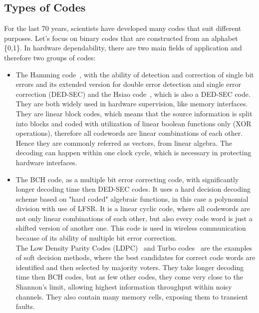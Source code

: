 \subsection{Types of Codes}
For the last 70 years, scientists have developed many codes that suit different purposes. Let's focus on binary codes that are constructed from an alphabet \{0,1\}. In hardware dependability, there are two main fields of application and therefore two groups of codes:
\begin{itemize}
\item The Hamming code~\cite{art:Hamming}, with the ability of detection and correction of single bit errors and its extended version for double error detection and single error correction (DED-SEC) and the Hsiao code~\cite{art:Hsiao}, which is also a DED-SEC code. They are both widely used in hardware supervision, like memory interfaces. They are linear block codes, which means that the source information is split into blocks and coded with utilization of linear boolean functions only (XOR operations), therefore all codewords are linear combinations of each other. Hence they are commonly referred as vectors, from linear algebra. The decoding can happen within one clock cycle, which is necessary in protecting hardware interfaces.  
\item The BCH code, as a multiple bit error correcting code, with significantly longer decoding time then DED-SEC codes. It uses a hard decision decoding scheme based on "hard coded" algebraic functions, in this case a polynomial division with use of LFSR. It is a linear cyclic code, where all codewords are not only linear combinations of each other, but also every code word is just a shifted version of another one. This code is used in wireless communication because of its ability of multiple bit error correction.\\
The Low Density Parity Codes (LDPC)~\cite{art:LDPC} and Turbo codes~\cite{art:turbo} are the examples of soft decision methods, where the best candidates for correct code words are identified and then selected by majority voters. They take longer decoding time then BCH codes, but as few other codes, they come very close to the Shannon's limit, allowing highest information throughput within noisy channels. They also contain many memory cells, exposing them to transient faults.\\
\end{itemize}

